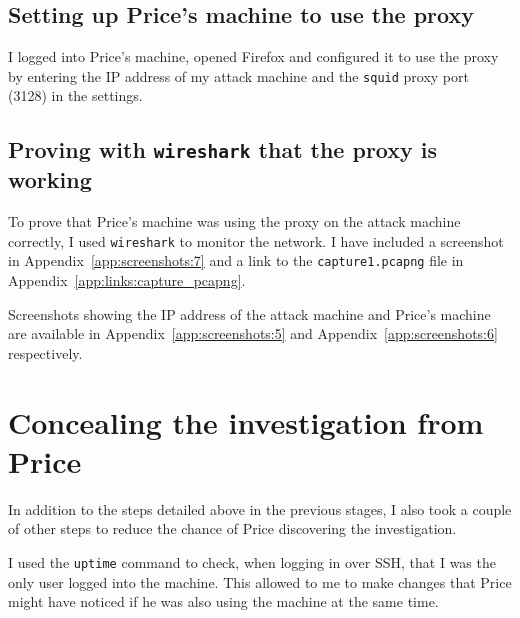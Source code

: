 \documentclass[12pt]{report}
\newcommand{\term}[1]{\colorbox{light-gray}{\texttt{#1}}}
\begin{document}
\subsection*{Setting up Price's machine to use the proxy}
%

I logged into Price's machine, opened Firefox and configured it to use the proxy by entering the IP address of my attack machine and the \texttt{squid} proxy port (3128) in the settings.



\subsection*{Proving with \texttt{wireshark} that the proxy is working}
To prove that Price's machine was using the proxy on the attack machine correctly, I used \texttt{wireshark} to monitor the network. I have included a screenshot in Appendix~\ref{app:screenshots:7} and a link to the \texttt{capture1.pcapng} file in Appendix~\ref{app:links:capture_pcapng}.

Screenshots showing the IP address of the attack machine and Price's machine are available in Appendix~\ref{app:screenshots:5} and Appendix~\ref{app:screenshots:6} respectively.


\section{Concealing the investigation from Price}
In addition to the steps detailed above in the previous stages, I also took a couple of other steps to reduce the chance of Price discovering the investigation.

I used the \term{uptime} command to check, when logging in over SSH, that I was the only user logged into the machine. This allowed to me to make changes that Price might have noticed if he was also using the machine at the same time.
\end{document}
